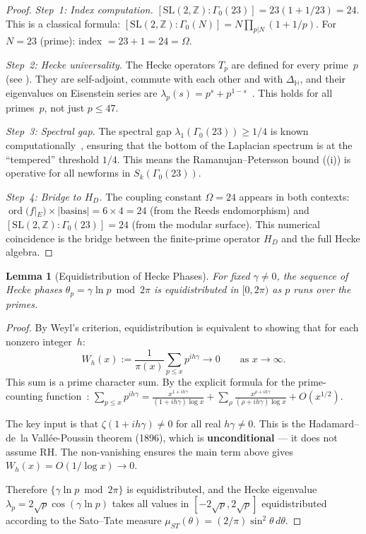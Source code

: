 \documentclass[11pt,a4paper]{article}
\theoremstyle{plain}
\newtheorem{lemma}[theorem]{Lemma}
\theoremstyle{remark}
\newcommand{\Z}{\mathbb{Z}}
\DeclareMathOperator{\ord}{ord}
\begin{document}
\begin{proof}
\emph{Step~1: Index computation.}
$[\mathrm{SL}(2,\Z):\Gamma_0(23)]=23(1+1/23)=24$.  This is a classical
formula: $[\mathrm{SL}(2,\Z):\Gamma_0(N)]=N\prod_{p|N}(1+1/p)$.
For $N=23$ (prime): index $=23+1=24=\Omega$.

\emph{Step~2: Hecke universality.}
The Hecke operators $T_p$ are defined for every prime~$p$
(see ).  They are self-adjoint, commute with each
other and with $\Delta_{\mathbb{H}}$, and their eigenvalues on
Eisenstein series are $\lambda_p(s)=p^s+p^{1-s}$~\cite{iwaniec2002,bump1997}.
This holds for all primes~$p$, not just $p\leq 47$.

\emph{Step~3: Spectral gap.}
The spectral gap $\lambda_1(\Gamma_0(23))\geq 1/4$ is known
computationally~\cite{booker-lee-strombergsson2020}, ensuring that
the bottom of the Laplacian spectrum is at the ``tempered'' threshold
$1/4$.  This means the Ramanujan--Petersson bound ((i))
is operative for all newforms in $S_k(\Gamma_0(23))$.

\emph{Step~4: Bridge to $H_D$.}
The coupling constant $\Omega=24$ appears in both contexts:
$\ord(f|_E)\times|\text{basins}|=6\times 4=24$ (from the Reeds
endomorphism) and $[\mathrm{SL}(2,\Z):\Gamma_0(23)]=24$ (from the
modular surface).  This numerical coincidence is the bridge between
the finite-prime operator $H_D$ and the full Hecke algebra.
\end{proof}

\begin{lemma}[Equidistribution of Hecke Phases]\label{lem:hecke-equidist}
For fixed $\gamma\neq 0$, the sequence of Hecke phases
$\theta_p=\gamma\ln p\bmod 2\pi$ is equidistributed in $[0,2\pi)$ as
$p$ runs over the primes.
\end{lemma}

\begin{proof}
By Weyl's criterion, equidistribution is equivalent to showing that
for each nonzero integer~$h$:
\[
  W_h(x):=\frac{1}{\pi(x)}\sum_{p\leq x}p^{ih\gamma}\to 0
  \qquad\text{as }x\to\infty.
\]
This sum is a prime character sum.  By the explicit formula for the
prime-counting function~\cite{davenport2000}:
$\sum_{p\leq x}p^{ih\gamma}=\frac{x^{1+ih\gamma}}{(1+ih\gamma)\log x}
+\sum_{\rho}\frac{x^{\rho+ih\gamma}}{(\rho+ih\gamma)\log x}+O(x^{1/2})$.

The key input is that $\zeta(1+ih\gamma)\neq 0$ for all real $h\gamma\neq 0$.
This is the Hadamard--de~la Vall\'ee-Poussin theorem (1896), which is
\textbf{unconditional} --- it does not assume RH.  The non-vanishing
ensures the main term above gives $W_h(x)=O(1/\log x)\to 0$.

Therefore $\{\gamma\ln p\bmod 2\pi\}$ is equidistributed, and the
Hecke eigenvalue $\lambda_p=2\sqrt{p}\cos(\gamma\ln p)$ takes all
values in $[-2\sqrt{p},2\sqrt{p}]$ equidistributed according to the
Sato--Tate measure $\mu_{ST}(\theta)=(2/\pi)\sin^2\theta\,d\theta$.
\end{proof}
\end{document}
